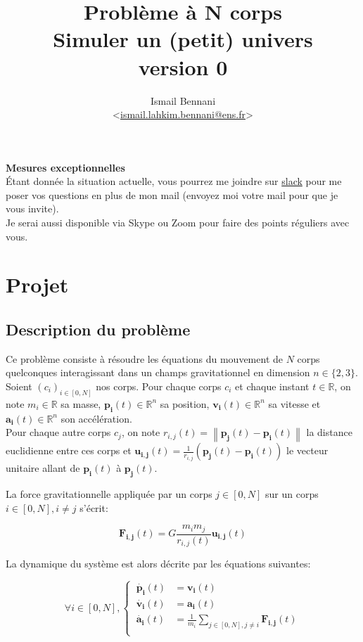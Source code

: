 \documentclass{article}
\title{\textbf{Problème à N corps} \\
       \Large Simuler un (petit) univers\\
       \small version 0}
\author{Ismail Bennani \\
        <\href{mailto:ismail.lahkim.bennani@ens.fr}{ismail.lahkim.bennani@ens.fr}>}
\newcommand{\norm}[1]{\left\lVert#1\right\rVert}
\newcommand{\myvec}[1]{\ensuremath{\mathbf{#1}}}
\begin{document}
\maketitle

\noindent\textbf{Mesures exceptionnelles}\\
Étant donnée la situation actuelle, vous pourrez me joindre sur \href{https://join.slack.com/t/in104n-bodyproblem/shared_invite/zt-cu07sew6-nw8ikZtOZBy2UmpqReQdWA}{slack} pour me poser vos questions en plus de mon mail (envoyez moi votre mail pour que je vous invite). \\
Je serai aussi disponible via Skype ou Zoom pour faire des points réguliers avec vous.


\section{Projet}

\subsection{Description du problème}

Ce problème consiste à résoudre les équations du mouvement de $N$ corps quelconques interagissant dans un champs gravitationnel en dimension ${n\in \{ 2,3 \}}$.\\
Soient $(c_i)_{i\in[0,N]}$ nos corps. Pour chaque corps $c_i$ et chaque instant $t \in \mathbb{R}$, on note $m_i \in \mathbb{R}$ sa masse, $\myvec{p_i}(t) \in \mathbb{R}^n$ sa position, $\myvec{v_i}(t) \in \mathbb{R}^n$ sa vitesse et $\myvec{a_i}(t) \in \mathbb{R}^n$ son accélération.\\
Pour chaque autre corps $c_j$, on note $r_{i,j}(t) = \norm{\myvec{p_j}(t) - \myvec{p_i}(t)}$ la distance euclidienne entre ces corps et $\myvec{u_{i,j}}(t) = \frac{1}{r_{i,j}}(\myvec{p_j}(t)-\myvec{p_i}(t))$ le vecteur unitaire allant de $\myvec{p_i}(t)$ à $\myvec{p_j}(t)$.

La force gravitationnelle appliquée par un corps $j \in [0,N]$ sur un corps $i \in [0,N], i \ne j$ s'écrit:

\begin{equation*}
    \myvec{F_{i,j}}(t) = G \frac{m_im_j}{r_{i,j}(t)} \myvec{u_{i,j}}(t)
\end{equation*}

La dynamique du système est alors décrite par les équations suivantes:

\begin{equation*}
\forall i \in [0,N], \left\{\begin{aligned}
    \ \myvec{\dot{p_i}}(t) & = \myvec{v_i}(t) \\
    \ \myvec{\dot{v_i}}(t) & = \myvec{a_i}(t) \\
    \ \myvec{\dot{a_i}}(t) & = \frac{1}{m_i} \sum_{j \in [0,N], j \ne i} \myvec{F_{i,j}}(t) \\
\end{aligned}\right.
\end{equation*}
\end{document}
